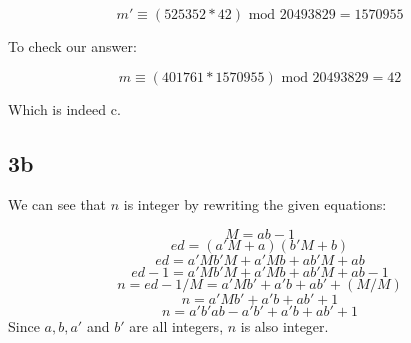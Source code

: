 \documentclass{article}
\begin{document}
\[m'\equiv (525352*42) \mbox{ mod 20493829} = 1570955\]

To check our answer:

\[m\equiv (401761*1570955) \mbox{ mod 20493829} = 42\]

Which is indeed c.


\subsection{3b}
We can see that $n$ is integer by rewriting the given equations:

\[M=ab-1 \]
\[ed=(a'M+a)(b'M+b)\]
\[ed=a'Mb'M + a'Mb + ab'M + ab \]
\[ed-1=a'Mb'M + a'Mb + ab'M + ab-1 \]
\[n=ed-1/M=a'Mb' + a'b  + ab' + (M/M) \]
\[n=a'Mb' + a'b  + ab' + 1 \]
\[n=a'b'ab - a'b' + a'b  + ab' + 1 \]
Since $a, b, a'$ and $b'$ are all integers, $n$ is also integer.
\end{document}
